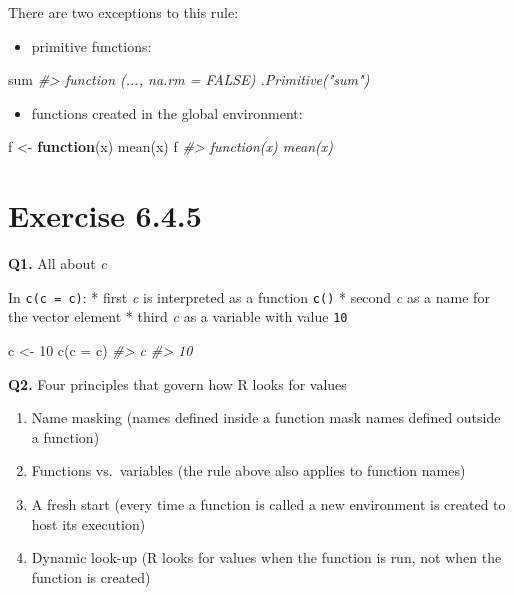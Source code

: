 \documentclass[
]{book}
\newenvironment{Shaded}{\begin{snugshade}}{\end{snugshade}}
\newcommand{\AttributeTok}[1]{\textcolor[rgb]{0.77,0.63,0.00}{#1}}
\newcommand{\CommentTok}[1]{\textcolor[rgb]{0.56,0.35,0.01}{\textit{#1}}}
\newcommand{\ControlFlowTok}[1]{\textcolor[rgb]{0.13,0.29,0.53}{\textbf{#1}}}
\newcommand{\DecValTok}[1]{\textcolor[rgb]{0.00,0.00,0.81}{#1}}
\newcommand{\FunctionTok}[1]{\textcolor[rgb]{0.00,0.00,0.00}{#1}}
\newcommand{\NormalTok}[1]{#1}
\newcommand{\OtherTok}[1]{\textcolor[rgb]{0.56,0.35,0.01}{#1}}
\providecommand{\tightlist}{%
  \setlength{\itemsep}{0pt}\setlength{\parskip}{0pt}}
\begin{document}
There are two exceptions to this rule:

\begin{itemize}
\tightlist
\item
  primitive functions:
\end{itemize}

\begin{Shaded}
\begin{Highlighting}[]
\NormalTok{sum}
\CommentTok{\#\textgreater{} function (..., na.rm = FALSE)  .Primitive("sum")}
\end{Highlighting}
\end{Shaded}

\begin{itemize}
\tightlist
\item
  functions created in the global environment:
\end{itemize}

\begin{Shaded}
\begin{Highlighting}[]
\NormalTok{f }\OtherTok{\textless{}{-}} \ControlFlowTok{function}\NormalTok{(x) }\FunctionTok{mean}\NormalTok{(x)}
\NormalTok{f}
\CommentTok{\#\textgreater{} function(x) mean(x)}
\end{Highlighting}
\end{Shaded}

\hypertarget{exercise-6.4.5}{%
\section{Exercise 6.4.5}\label{exercise-6.4.5}}

\textbf{Q1.} All about \emph{c}

In \texttt{c(c\ =\ c)}:
* first \emph{c} is interpreted as a function \texttt{c()}
* second \emph{c} as a name for the vector element
* third \emph{c} as a variable with value \texttt{10}

\begin{Shaded}
\begin{Highlighting}[]
\NormalTok{c }\OtherTok{\textless{}{-}} \DecValTok{10}
\FunctionTok{c}\NormalTok{(}\AttributeTok{c =}\NormalTok{ c)}
\CommentTok{\#\textgreater{}  c }
\CommentTok{\#\textgreater{} 10}
\end{Highlighting}
\end{Shaded}

\textbf{Q2.} Four principles that govern how R looks for values

\begin{enumerate}
\def\labelenumi{\arabic{enumi}.}
\item
  Name masking (names defined inside a function mask names defined outside a function)
\item
  Functions vs.~variables (the rule above also applies to function names)
\item
  A fresh start (every time a function is called a new environment is created to host its execution)
\item
  Dynamic look-up (R looks for values when the function is run, not when the function is created)
\end{enumerate}
\end{document}
